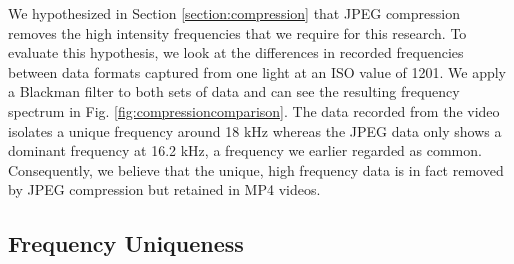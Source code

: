 \documentclass[conference]{IEEEtran}
\begin{document}
We hypothesized in Section \ref{section:compression} that  JPEG compression removes the high intensity frequencies that we require for this research. To evaluate this hypothesis, we look at the differences in recorded frequencies between data formats captured from one light at an ISO value of 1201. We apply a Blackman filter to both sets of data and can see the resulting frequency spectrum in Fig. \ref{fig:compressioncomparison}. The data recorded from the video isolates a unique frequency around 18 kHz whereas the JPEG data only shows a dominant frequency at 16.2 kHz, a frequency we earlier regarded as common. Consequently, we believe that the unique, high frequency data is in fact removed by JPEG compression but retained in MP4 videos.

\subsection{Frequency Uniqueness}
\end{document}
